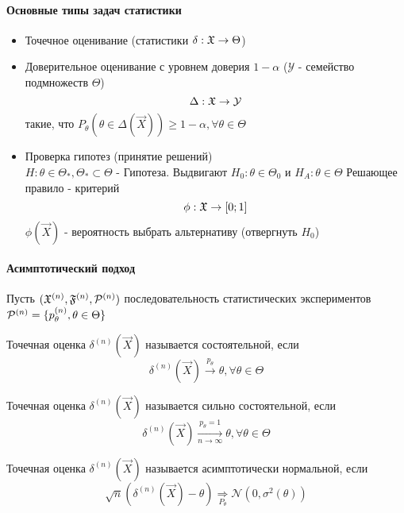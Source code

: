 \documentclass[main.tex]{subfiles}
\begin{document}
\paragraph{Основные типы задач статистики}
\begin{itemize}
	\item Точечное оценивание (статистики $\delta : \mathfrak{X} \rightarrow \Theta$)
	\item Доверительное оценивание с уровнем доверия $1-\alpha$ ($\mathcal{Y}$ - семейство подмножеств $\Theta$)
		$$\Delta : \mathfrak{X} \rightarrow \mathcal{Y}$$
	такие, что $P_\theta (\theta \in \Delta (\vec{X})) \geq 1-\alpha, \forall \theta \in \Theta$
	\item Проверка гипотез (принятие решений) \\
	$H:\theta \in \Theta_*, \Theta_* \subset \Theta$ - Гипотеза. Выдвигают $H_0 : \theta \in \Theta_0$ и $H_A : \theta \in \Theta$ Решающее правило - критерий
	$$\phi : \mathfrak{X} \rightarrow [0;1]$$
	$\phi(\vec{X})$ - вероятность выбрать альтернативу (отвергнуть $H_0$)
\end{itemize}

\paragraph{Асимптотический подход}
Пусть $(\mathfrak{X}^{(n)},\mathfrak{F}^{(n)},\mathcal{P}^{(n)})$ последовательность статистических экспериментов
$\mathcal{P}^{(n)}=\{p_\theta^{(n)},\theta \in \Theta\}$

\begin{definition}
	 Точечная оценка $\delta^{(n)}(\vec{X})$ называется состоятельной, если
	 $$\delta^{(n)}(\vec{X}) \xrightarrow{p_\theta} \theta,\forall \theta \in \Theta $$
\end{definition}
 
\begin{definition}
	Точечная оценка $\delta^{(n)}(\vec{X})$ называется сильно состоятельной, если
	 $$\delta^{(n)}(\vec{X}) \xrightarrow[n \rightarrow \infty]{p_\theta = 1} \theta,\forall \theta \in \Theta $$
\end{definition}

\begin{definition}
	Точечная оценка $\delta^{(n)}(\vec{X})$ называется асимптотически нормальной, если
	$$\sqrt{n} (\delta^{(n)}(\vec{X}) - \theta) \underset{P_\theta}{\Rightarrow} \mathcal{N}(0,\sigma^2(\theta))$$
\end{definition}
\end{document}
